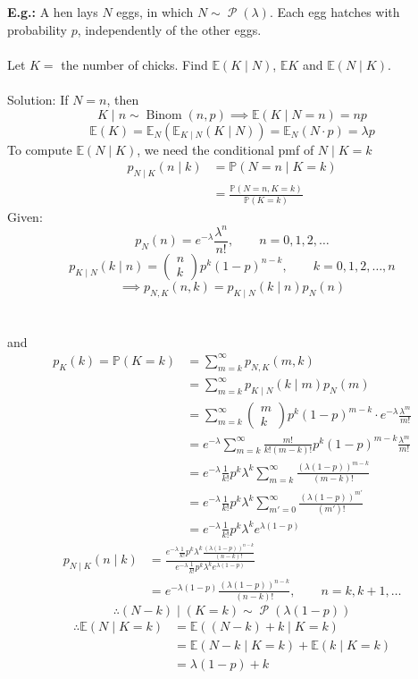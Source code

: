 \documentclass[a4paper]{article}
\newcommand{\n}{\hfill\break}
\newcommand{\eg}[1]{\par\noindent\settowidth{\hangindent}{\textbf{E.g.: }}\textbf{E.g.: }#1\n}
\newcommand{\Prob}{\mathbb{P}}
\renewcommand{\P}{\Prob}
\newcommand{\Avg}{\mathbb{E}}
\newcommand{\E}{\Avg}
\DeclareMathOperator{\Binom}{Binom}
\DeclareMathOperator{\Poiss}{\mathcal{P}}
\begin{document}
\eg{
    A hen lays $N$ eggs, in which $N\sim\Poiss(\lambda)$. Each egg hatches with probability $p$, independently of the other eggs.
    \\\\
    Let $K=$ the number of chicks. Find $\E(K\mid N)$, $\E K$ and $\E(N\mid K)$.
    \\\\
    Solution: If $N=n$, then
    \[K\mid n\sim\Binom(n,p)\implies\E(K\mid N=n)=np\]
    \[\E(K)=\E_N(\E_{K\mid N}(K\mid N))=\E_N(N\cdot p)=\lambda p\]
    To compute $\E(N\mid K)$, we need the conditional pmf of $N\mid K=k$
    \begin{align*}
        p_{N\mid K}(n\mid k)&=\P(N=n\mid K=k) \\
        &=\frac{\P(N=n, K=k)}{\P(K=k)}
    \end{align*}
    Given: 
    \[p_N(n)=e^{-\lambda}\frac{\lambda^n}{n!}, \qquad n=0,1,2,\dots\]
    \[p_{K\mid N}(k\mid n)=\begin{pmatrix}n\\k\end{pmatrix}p^k(1-p)^{n-k}, \qquad k=0,1,2,\dots,n\]
    \[\implies p_{N,K}(n,k)=p_{K\mid N}(k\mid n)p_N(n)\]
    \\\\
    and
    \begin{align*}
        p_K(k)=\P(K=k)&=\sum_{m=k}^\infty p_{N,K}(m,k) \\
        &=\sum_{m=k}^\infty p_{K\mid N}(k\mid m)p_N(m) \\
        &=\sum_{m=k}^\infty\begin{pmatrix}m\\k\end{pmatrix}p^k(1-p)^{m-k}\cdot e^{-\lambda}\frac{\lambda^m}{m!} \\
        &=e^{-\lambda}\sum^\infty_{m=k}\frac{m!}{k!(m-k)!}p^k(1-p)^{m-k}\frac{\lambda^m}{m!} \\
        &=e^{-\lambda}\frac{1}{k!}p^k\lambda^k\sum^\infty_{m=k}\frac{(\lambda(1-p))^{m-k}}{(m-k)!} \\
        &=e^{-\lambda}\frac{1}{k!}p^k\lambda^k\sum^\infty_{m'=0}\frac{(\lambda(1-p))^{m'}}{(m')!} \\
        &=e^{-\lambda}\frac{1}{k!}p^k\lambda^k e^{\lambda(1-p)}
    \end{align*}
    \begin{align*}
        p_{N\mid K}(n\mid k)&=\frac{e^{-\lambda}\frac{1}{k!}p^k\lambda^k\frac{(\lambda(1-p))^{n-k}}{(n-k)!}}{e^{-\lambda}\frac{1}{k!}p^k\lambda^k e^{\lambda(1-p)}} \\
        &=e^{-\lambda(1-p)}\frac{(\lambda(1-p))^{n-k}}{(n-k)!}, \qquad n=k,k+1,\dots
    \end{align*}
    \[\therefore (N-k)\mid(K=k)\sim\Poiss(\lambda(1-p))\]
    \begin{align*}
        \therefore \E(N\mid K=k)&=\E((N-k)+k\mid K=k) \\
        &=\E(N-k\mid K=k)+\E(k\mid K=k) \\
        &=\lambda(1-p)+k
    \end{align*}
}
\end{document}
